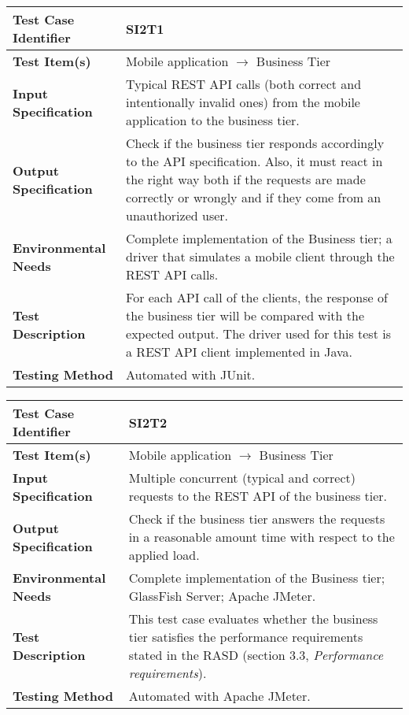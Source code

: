 \begin{tabular}{l p{}}
    \hline
    \textbf{Test Case Identifier} & SI2T1\\
    \hline
    \textbf{Test Item(s)} & Mobile application $\rightarrow$ Business Tier\\
    \hline
    \textbf{Input Specification} & Typical REST API calls (both correct and intentionally invalid ones) from the mobile application to the business tier.\\
    \hline
    \textbf{Output Specification} & Check if the business tier responds accordingly to the API specification. Also, it must react in the right way both if the requests are made correctly or wrongly and if they come from an unauthorized user.\\
    \hline
    \textbf{Environmental Needs} & Complete implementation of the Business tier; a driver that simulates a mobile client through the REST API calls. \\
    \hline
    \textbf{Test Description} & For each API call of the clients, the response of the business tier will be compared with the expected output. The driver used for this test is a REST API client implemented in Java.\\
    \hline
    \textbf{Testing Method} & Automated with JUnit.\\
    \hline
\end{tabular}

\vspace{2em}

\noindent\begin{tabular}{l p{}}
    \hline
    \textbf{Test Case Identifier} & SI2T2\\
    \hline
    \textbf{Test Item(s)} & Mobile application $\rightarrow$ Business Tier\\
    \hline
    \textbf{Input Specification} & Multiple concurrent (typical and correct) requests to the REST API of the business tier.\\
    \hline
    \textbf{Output Specification} & Check if the business tier answers the requests in a reasonable amount time with respect to the applied load. \\
    \hline
    \textbf{Environmental Needs} & Complete implementation of the Business tier; GlassFish Server; Apache JMeter.\\
    \hline
    \textbf{Test Description} & This test case evaluates whether the business tier satisfies the performance requirements stated in the RASD (section 3.3, \emph{Performance requirements}).\\
    \hline
    \textbf{Testing Method} & Automated with Apache JMeter. \\
    \hline
\end{tabular}

